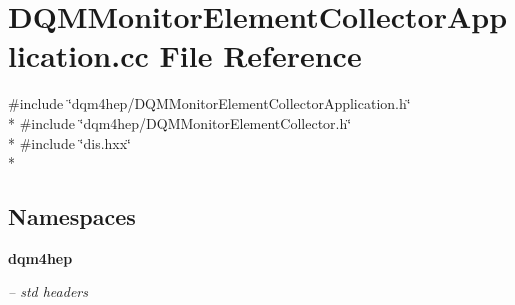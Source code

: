 \section{D\+Q\+M\+Monitor\+Element\+Collector\+Application.\+cc File Reference}
\label{DQMMonitorElementCollectorApplication_8cc}
{\ttfamily \#include \char`\"{}dqm4hep/\+D\+Q\+M\+Monitor\+Element\+Collector\+Application.\+h\char`\"{}}\\*
{\ttfamily \#include \char`\"{}dqm4hep/\+D\+Q\+M\+Monitor\+Element\+Collector.\+h\char`\"{}}\\*
{\ttfamily \#include \char`\"{}dis.\+hxx\char`\"{}}\\*
\subsection*{Namespaces}
\begin{DoxyCompactItemize}
\item 
 {\bf dqm4hep}
\begin{DoxyCompactList}\small\item\em -- std headers \end{DoxyCompactList}\end{DoxyCompactItemize}
